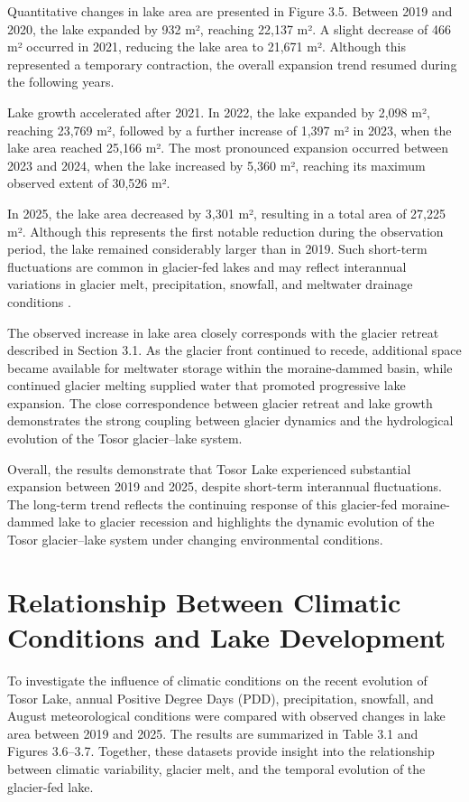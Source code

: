 \documentclass[12pt,a4paper]{report}
\begin{document}
Quantitative changes in lake area are presented in Figure 3.5. Between 2019 and 2020, the lake expanded by 932 m², reaching 22,137 m². A slight decrease of 466 m² occurred in 2021, reducing the lake area to 21,671 m². Although this represented a temporary contraction, the overall expansion trend resumed during the following years.

Lake growth accelerated after 2021. In 2022, the lake expanded by 2,098 m², reaching 23,769 m², followed by a further increase of 1,397 m² in 2023, when the lake area reached 25,166 m². The most pronounced expansion occurred between 2023 and 2024, when the lake increased by 5,360 m², reaching its maximum observed extent of 30,526 m².

In 2025, the lake area decreased by 3,301 m², resulting in a total area of 27,225 m². Although this represents the first notable reduction during the observation period, the lake remained considerably larger than in 2019. Such short-term fluctuations are common in glacier-fed lakes and may reflect interannual variations in glacier melt, precipitation, snowfall, and meltwater drainage conditions \cite{Sorg2012}.

The observed increase in lake area closely corresponds with the glacier retreat described in Section 3.1. As the glacier front continued to recede, additional space became available for meltwater storage within the moraine-dammed basin, while continued glacier melting supplied water that promoted progressive lake expansion. The close correspondence between glacier retreat and lake growth demonstrates the strong coupling between glacier dynamics and the hydrological evolution of the Tosor glacier–lake system.

Overall, the results demonstrate that Tosor Lake experienced substantial expansion between 2019 and 2025, despite short-term interannual fluctuations. The long-term trend reflects the continuing response of this glacier-fed moraine-dammed lake to glacier recession and highlights the dynamic evolution of the Tosor glacier–lake system under changing environmental conditions.

\section{Relationship Between Climatic Conditions and Lake Development}

To investigate the influence of climatic conditions on the recent evolution of Tosor Lake, annual Positive Degree Days (PDD), precipitation, snowfall, and August meteorological conditions were compared with observed changes in lake area between 2019 and 2025. The results are summarized in Table 3.1 and Figures 3.6–3.7. Together, these datasets provide insight into the relationship between climatic variability, glacier melt, and the temporal evolution of the glacier-fed lake.
\end{document}
